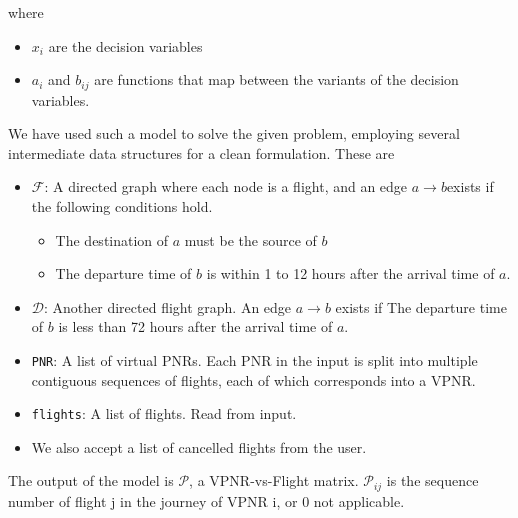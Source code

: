 \documentclass{article}
\begin{document}
\begin{flushleft}
where \begin{itemize}
    \item \(x_i\) are the decision variables
    \item \(a_i\) and \(b_{ij}\) are functions that map between the variants of the decision variables.
\end{itemize}

We have used such a model to solve the given problem, employing several intermediate data structures for a clean formulation. These are \begin{itemize}
    \item \(\mathcal{F}\): A directed graph where each node is a flight, and an edge \(a \rightarrow b\)exists if the following conditions hold. \begin{itemize}
        \item The destination of \(a\) must be the source of \(b\)
        \item The departure time of \(b\) is within 1 to 12 hours after the arrival time of \(a\).
    \end{itemize}
    \item \(\mathcal{D}\): Another directed flight graph. An edge \(a \rightarrow b\) exists if The departure time of \(b\) is less than 72 hours after the arrival time of \(a\).
    \item \texttt{PNR}: A list of virtual PNRs. Each PNR in the input is split into multiple contiguous sequences of flights, each of which corresponds into a VPNR.
    \item \texttt{flights}: A list of flights. Read from input.
    \item We also accept a list of cancelled flights from the user.
\end{itemize}

The output of the model is \(\mathcal{P}\), a VPNR-vs-Flight matrix. \(\mathcal{P}_{ij}\) is the sequence number of flight j in the journey of VPNR i, or 0 not applicable.

\end{flushleft}
\end{document}
